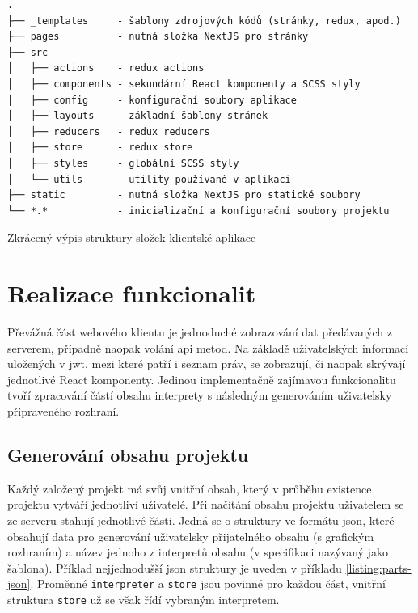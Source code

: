 \begin{fig:code}
	\begin{verbatim}
.
├── _templates     - šablony zdrojových kódů (stránky, redux, apod.)
├── pages          - nutná složka NextJS pro stránky
├── src
│   ├── actions    - redux actions
│   ├── components - sekundární React komponenty a SCSS styly
│   ├── config     - konfigurační soubory aplikace
│   ├── layouts    - základní šablony stránek
│   ├── reducers   - redux reducers
│   ├── store      - redux store
│   ├── styles     - globální SCSS styly
│   └── utils      - utility používané v aplikaci
├── static         - nutná složka NextJS pro statické soubory
└── *.*            - inicializační a konfigurační soubory projektu
   \end{verbatim}
   \caption{Zkrácený výpis struktury složek klientské aplikace}\label{folders:client}
\end{fig:code}

   



\section{Realizace funkcionalit}

Převážná část webového klientu je jednoduché zobrazování dat předávaných z serverem, případně naopak volání \gls{api} metod. Na základě uživatelských informací uložených v \gls{jwt}, mezi které patří i seznam práv, se zobrazují, či naopak skrývají jednotlivé React komponenty. Jedinou implementačně zajímavou funkcionalitu tvoří zpracování částí obsahu interprety s následným generováním uživatelsky připraveného rozhraní.


\subsection{Generování obsahu projektu}
Každý založený projekt má svůj vnitřní obsah, který v průběhu existence projektu vytváří jednotliví uživatelé. Při načítání obsahu projektu uživatelem se ze serveru stahují jednotlivé části. Jedná se o struktury ve formátu \gls{json}, které obsahují data pro generování uživatelsky přijatelného obsahu (s grafickým rozhraním) a název jednoho z interpretů obsahu (v specifikaci nazývaný jako šablona). Příklad nejjednodušší \gls{json} struktury je uveden v příkladu \ref{listing:parts-json}. Proměnné \texttt{interpreter} a \texttt{store} jsou povinné pro každou část, vnitřní struktura \texttt{store} už se však řídí vybraným interpretem. 

